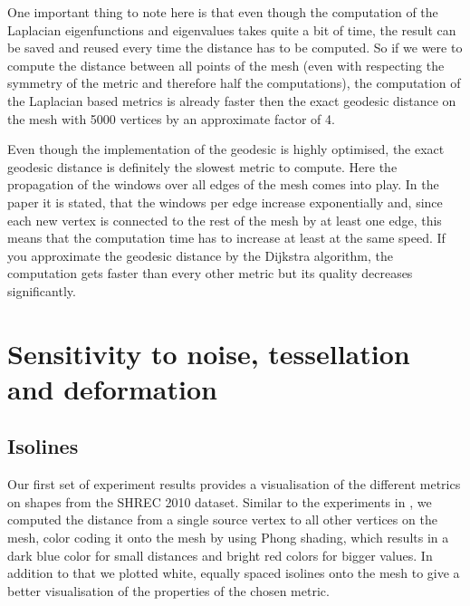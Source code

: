 One important thing to note here is that even though the computation of the Laplacian eigenfunctions and eigenvalues takes quite a bit of time, the result can be saved and reused every time the distance has to be computed.
So if we were to compute the distance between all points of the mesh (even with respecting the symmetry of the metric and therefore half the computations), the computation of the Laplacian based metrics is already faster then the exact geodesic distance on the mesh with 5000 vertices by an approximate factor of 4.

Even though the implementation of the geodesic is highly optimised, the exact geodesic distance is definitely the slowest metric to compute.
Here the propagation of the windows over all edges of the mesh comes into play.
In the paper \cite{surazhsky2005fast} it is stated, that the windows per edge increase exponentially and, since each new vertex is connected to the rest of the mesh by at least one edge, this means that the computation time has to increase at least at the same speed.
If you approximate the geodesic distance by the Dijkstra algorithm, the computation gets faster than every other metric but its quality decreases significantly.

\section{Sensitivity to noise, tessellation and deformation}

\subsection{Isolines}
Our first set of experiment results provides a visualisation of the different metrics on shapes from the SHREC 2010 dataset.
Similar to the experiments in \cite{lipman2010biharmonic}, we computed the distance from a single source vertex to all other vertices on the mesh, color coding it onto the mesh by using Phong shading, which results in a dark blue color for small distances and bright red colors for bigger values.
In addition to that we plotted white, equally spaced isolines onto the mesh to give a better visualisation of the properties of the chosen metric.

